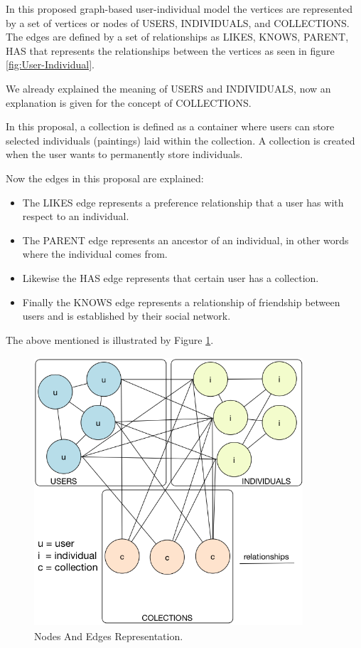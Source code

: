 In this proposed graph-based user-individual model the vertices are represented
by a set of vertices or nodes of USERS, INDIVIDUALS, and COLLECTIONS.
The edges are defined by a set of relationships as LIKES,
KNOWS, PARENT, HAS that represents the relationships between the vertices
as seen in figure \ref{fig:User-Individual}.

We already explained the meaning of USERS and INDIVIDUALS, now an explanation is
given for the concept of COLLECTIONS.

In this proposal, a collection is defined as a container where users can
store selected individuals (paintings) laid within the collection. A collection
is created when the user wants to permanently store individuals.

Now the edges in this proposal are explained:

\begin{itemize}
\item The LIKES edge represents a preference relationship that
a user has with respect to an individual.
\item The PARENT edge represents an ancestor of an individual,
 in other words where the individual comes from.
\item Likewise the HAS edge represents that certain user has a collection.
\item Finally the KNOWS edge represents a relationship of friendship between users
and is established by their social network.
\end{itemize}

The above mentioned is illustrated by Figure \ref{fig:Nodes_Edges}.

\begin{figure}
\captionsetup{justification=centering,margin=2cm}
\centering
\setlength\fboxsep{0pt}
\setlength\fboxrule{0.7pt}
\includegraphics[width=10cm,height=10cm,keepaspectratio]{img/user_individual_collections.png}
\caption{Nodes And Edges Representation.}
\label{fig:Nodes_Edges}
\end{figure}


